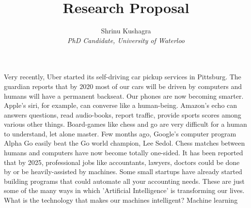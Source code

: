 \documentclass[11pt]{article}
\title{\textbf{Research Proposal}}
\author{Shrinu Kushagra\\
\textit{PhD Candidate, University of Waterloo}}
\date{}
\begin{document}
\maketitle

Very recently, Uber started its self-driving car pickup services in Pittsburg. The guardian reports that by $2020$ most of our cars will be driven by computers and humans will have a permanent backseat. Our phones are now becoming smarter. Apple's siri, for example, can converse like a human-being. Amazon's echo can answers questions, read audio-books, report traffic, provide sports scores among various other things. Board-games like chess and go are very difficult for a human to understand, let alone master. Few months ago, Google's computer program Alpha Go easily beat the Go world champion, Lee Sedol. Chess matches between humans and computers have now become totally one-sided. It has been reported that by 2025, professional jobs like accountants, lawyers, doctors could be done by or be heavily-assisted by machines. Some small startups have already started building programs that could automate all your accounting needs. These are just some of the many ways in which 'Artificial Intelligence' is transforming our lives.\\

What is the technology that makes our machines intelligent? Machine learning    
\end{document}
